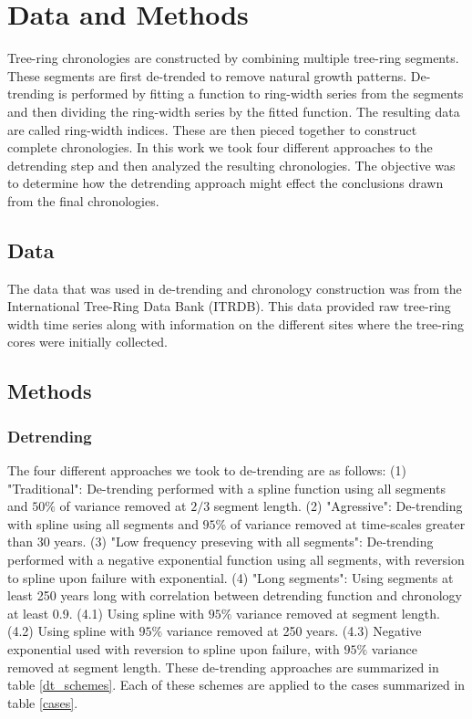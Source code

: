 \documentclass[smallextended]{svjour3}       %
\begin{document}
\section{Data and Methods}
\label{methods}
Tree-ring chronologies are constructed by combining multiple tree-ring segments. These segments are first de-trended to remove natural growth patterns. De-trending is performed by fitting a function to ring-width series from the segments and then dividing the ring-width series by the fitted function. The resulting data are called ring-width indices. These are then pieced together to construct complete chronologies. In this work we took four different approaches to the detrending step and then analyzed the resulting chronologies. The objective was to determine how the detrending approach might effect the conclusions drawn from the final chronologies.  
\subsection{Data}
The data that was used in de-trending and chronology construction was from the International Tree-Ring Data Bank (ITRDB). This data provided raw tree-ring width time series along with information on the different sites where the tree-ring cores were initially collected.  
\subsection{Methods}
\subsubsection{Detrending}
The four different approaches we took to de-trending are as follows: (1) "Traditional": De-trending performed with a spline function using all segments and $50\%$ of variance removed at $2/3$ segment length. (2) "Agressive": De-trending with spline using all segments and $95\%$ of variance removed at time-scales greater than 30 years. (3) "Low frequency preseving with all segments": De-trending performed with a negative exponential function using all segments, with reversion to spline upon failure with exponential. (4) "Long segments": Using segments at least 250 years long with correlation between detrending function and chronology at least 0.9. (4.1) Using spline with $95\%$ variance removed at segment length. (4.2) Using spline with $95\%$ variance removed at 250 years. (4.3) Negative exponential used with reversion to spline upon failure, with $95\%$ variance removed at segment length. These de-trending approaches are summarized in table \ref{dt_schemes}. Each of these schemes are applied to the cases summarized in table \ref{cases}. 
  
\end{document}
